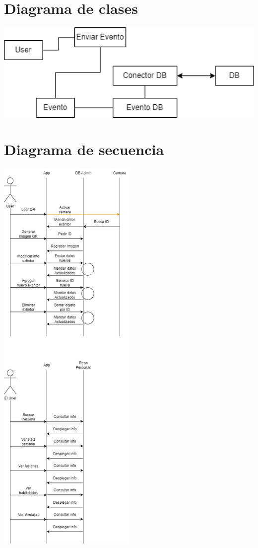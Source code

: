 \documentclass[a4paper,twoside,10pt]{report}
\begin{document}
\section{Diagrama de clases}


\includegraphics[width=1.0\textwidth]{ClasesExtintor.png}


\section{Diagrama de secuencia}


\includegraphics[width=0.50\textwidth]{Sequencia.png}
\end{document}

